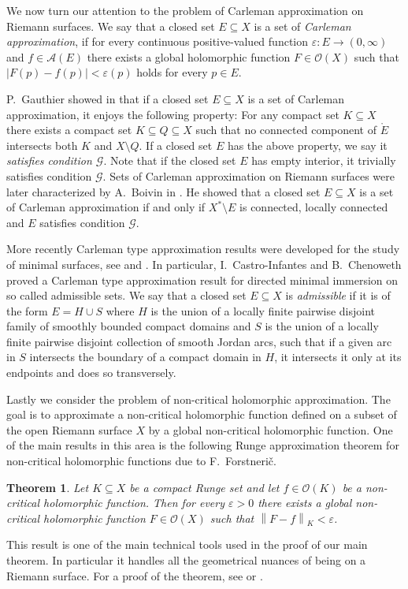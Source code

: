 \documentclass[a4paper,11pt]{amsart}
\newcommand{\abs}[1]{\left|#1\right|}
\newcommand{\norm}[1]{\left\lVert#1\right\rVert}
\newtheorem{theorem}{Theorem}
\begin{document}
We now turn our attention to the problem of Carleman approximation on Riemann surfaces.
We say that a closed set $E \subseteq X$ is a set of \emph{Carleman approximation}, if for every continuous positive-valued function $\varepsilon \colon E \to (0,\infty)$ and $f \in \mathcal{A}(E)$
there exists a global holomorphic function $F \in \mathcal{O}(X)$ such that $\abs{F(p)-f(p)} < \varepsilon(p)$ holds for every $p \in E$.

P.~Gauthier showed in \cite{Gauthier} that if a closed set $E \subseteq X$ is a set of Carleman approximation, it enjoys the following property: 
For any compact set $K \subseteq X$ there exists a compact set $K \subseteq Q \subseteq X$ such that no connected component of $\mathring{E}$ intersects both $K$ and $X \setminus Q$.
If a closed set $E$ has the above property, we say it \emph{satisfies condition $\mathcal{G}$}. Note that if the closed set $E$ has empty interior, it trivially satisfies condition $\mathcal{G}$.
Sets of Carleman approximation on Riemann surfaces were later characterized by A.~Boivin in \cite{Boivin1986}.
He showed that a closed set $E \subseteq X$ is a set of Carleman approximation if and only if $X^*\setminus E$ is connected, locally connected and $E$ satisfies condition $\mathcal{G}$.

More recently Carleman type approximation results were developed for the study of minimal surfaces, see \cite[Chapter 3.8]{MinimalSurfacesFromAnalyticPOV} and \cite{BrettCastro}.
In particular, I.~Castro-Infantes and B.~Chenoweth proved a Carleman type approximation result for directed minimal immersion on so called admissible sets.
We say that a closed set $E \subseteq X$ is \emph{admissible} if it is of the form $E = H \cup S$ where $H$ is the union of a locally finite pairwise disjoint family of smoothly bounded compact domains 
and $S$ is the union of a locally finite pairwise disjoint collection of smooth Jordan arcs, such that if a given arc in $S$ intersects the boundary of a compact domain in $H$, 
it intersects it only at its endpoints and does so transversely. 

Lastly we consider the problem of non-critical holomorphic approximation. 
The goal is to approximate a non-critical holomorphic function defined on a subset of the open Riemann surface $X$ by a global non-critical holomorphic function.  
One of the main results in this area is the following Runge approximation theorem for non-critical holomorphic functions due to F.~Forstnerič.
\begin{theorem} \label{Franci_X}
    Let $K \subseteq X$ be a compact Runge set and let $f \in \mathcal{O}(K)$ be a non-critical holomorphic function.
    Then for every $\varepsilon > 0$ there exists a global non-critical holomorphic function $F \in \mathcal{O}(X)$ such that $\norm{F-f}_K < \varepsilon$.
\end{theorem}  
This result is one of the main technical tools used in the proof of our main theorem. 
In particular it handles all the geometrical nuances of being on a Riemann surface.
For a proof of the theorem, see \cite[Theorem 2.1]{franc} or \cite[Theorem 9.13.10]{StainManifoldsAndHolomorphicMappings}. 
 
\end{document}
